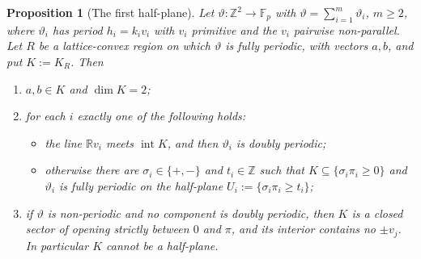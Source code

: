 \documentclass[11pt,reqno]{amsart}
\theoremstyle{plain}
\newtheorem{prop}[thm]{Proposition}
\theoremstyle{definition}
\theoremstyle{remark}
\theoremstyle{plain}
\theoremstyle{remark}
\theoremstyle{definition}
\numberwithin{equation}{section}
\newcommand{\R}{\mathbb{R}}
\newcommand{\Z}{\mathbb{Z}}
\newcommand{\Fp}{\mathbb{F}_p}
\begin{document}
\begin{prop}[The first half-plane]\label{prop:firsthalf}
Let $\vartheta\colon\Z^2\to\Fp$ with $\vartheta=\sum_{i=1}^m\vartheta_i$,
$m\ge2$, where $\vartheta_i$ has period $h_i=k_iv_i$ with $v_i$ primitive and
the $v_i$ pairwise non-parallel.  Let $R$ be a lattice-convex region on which
$\vartheta$ is fully periodic, with vectors $a,b$, and put $K:=K_R$.  Then
\begin{enumerate}
\item[\textup{(a)}] $a,b\in K$ and $\dim K=2$;
\item[\textup{(b)}] for each $i$ exactly one of the following holds:
 \begin{itemize}
 \item[$(\alpha)$] the line $\R v_i$ meets $\operatorname{int}K$, and then
 $\vartheta_i$ is doubly periodic;
 \item[$(\beta)$] otherwise there are $\sigma_i\in\{+,-\}$ and $t_i\in\Z$
 such that $K\subseteq\{\sigma_i\pi_i\ge0\}$ and $\vartheta_i$ is fully
 periodic on the half-plane $U_i:=\{\sigma_i\pi_i\ge t_i\}$;
 \end{itemize}
\item[\textup{(c)}] if $\vartheta$ is non-periodic and no component is doubly
periodic, then $K$ is a closed sector of opening strictly between $0$ and
$\pi$, and its interior contains no $\pm v_j$.  In particular $K$ cannot be
a half-plane.
\end{enumerate}
\end{prop}
\end{document}
